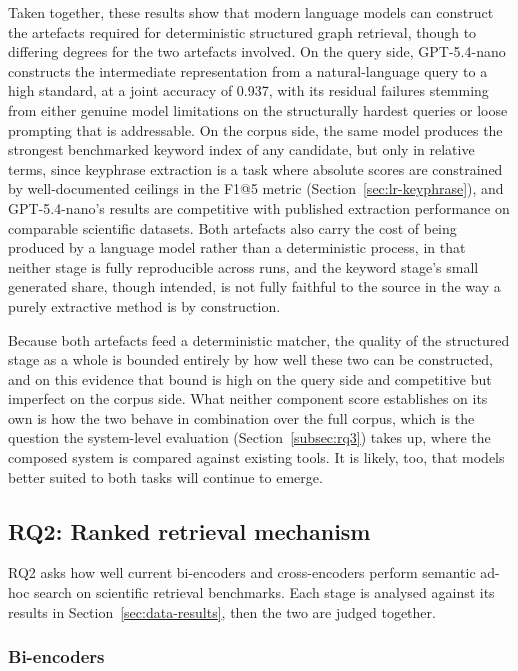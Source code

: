 Taken together, these results show that modern language models can construct the artefacts required for deterministic structured graph retrieval, though to differing degrees for the two artefacts involved. On the query side, GPT-5.4-nano constructs the intermediate representation from a natural-language query to a high standard, at a joint accuracy of 0.937, with its residual failures stemming from either genuine model limitations on the structurally hardest queries or loose prompting that is addressable. On the corpus side, the same model produces the strongest benchmarked keyword index of any candidate, but only in relative terms, since keyphrase extraction is a task where absolute scores are constrained by well-documented ceilings in the F1@5 metric (Section~\ref{sec:lr-keyphrase}), and GPT-5.4-nano's results are competitive with published extraction performance on comparable scientific datasets. Both artefacts also carry the cost of being produced by a language model rather than a deterministic process, in that neither stage is fully reproducible across runs, and the keyword stage's small generated share, though intended, is not fully faithful to the source in the way a purely extractive method is by construction.

Because both artefacts feed a deterministic matcher, the quality of the structured stage as a whole is bounded entirely by how well these two can be constructed, and on this evidence that bound is high on the query side and competitive but imperfect on the corpus side. What neither component score establishes on its own is how the two behave in combination over the full corpus, which is the question the system-level evaluation (Section~\ref{subsec:rq3}) takes up, where the composed system is compared against existing tools. It is likely, too, that models better suited to both tasks will continue to emerge.

\subsection{RQ2: Ranked retrieval mechanism}
\label{subsec:rq2}

RQ2 asks how well current bi-encoders and cross-encoders perform semantic ad-hoc search on scientific retrieval benchmarks. Each stage is analysed against its results in Section~\ref{sec:data-results}, then the two are judged together.

\subsubsection{Bi-encoders}

